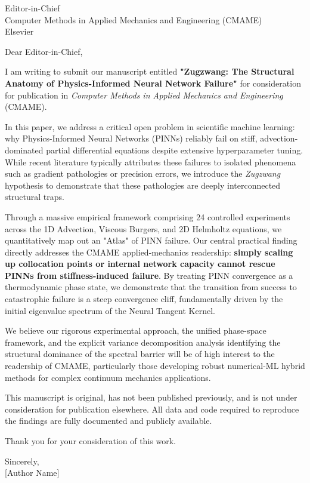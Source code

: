 \documentclass[11pt]{letter}
\begin{document}
\begin{letter}{
Editor-in-Chief\\
Computer Methods in Applied Mechanics and Engineering (CMAME)\\
Elsevier
}

\opening{Dear Editor-in-Chief,}

I am writing to submit our manuscript entitled \textbf{"Zugzwang: The Structural Anatomy of Physics-Informed Neural Network Failure"} for consideration for publication in \textit{Computer Methods in Applied Mechanics and Engineering} (CMAME).

In this paper, we address a critical open problem in scientific machine learning: why Physics-Informed Neural Networks (PINNs) reliably fail on stiff, advection-dominated partial differential equations despite extensive hyperparameter tuning. While recent literature typically attributes these failures to isolated phenomena such as gradient pathologies or precision errors, we introduce the \textit{Zugzwang} hypothesis to demonstrate that these pathologies are deeply interconnected structural traps.

Through a massive empirical framework comprising 24 controlled experiments across the 1D Advection, Viscous Burgers, and 2D Helmholtz equations, we quantitatively map out an "Atlas" of PINN failure. Our central practical finding directly addresses the CMAME applied-mechanics readership: \textbf{simply scaling up collocation points or internal network capacity cannot rescue PINNs from stiffness-induced failure}. By treating PINN convergence as a thermodynamic phase state, we demonstrate that the transition from success to catastrophic failure is a steep convergence cliff, fundamentally driven by the initial eigenvalue spectrum of the Neural Tangent Kernel.

We believe our rigorous experimental approach, the unified phase-space framework, and the explicit variance decomposition analysis identifying the structural dominance of the spectral barrier will be of high interest to the readership of CMAME, particularly those developing robust numerical-ML hybrid methods for complex continuum mechanics applications.

This manuscript is original, has not been published previously, and is not under consideration for publication elsewhere. All data and code required to reproduce the findings are fully documented and publicly available.

Thank you for your consideration of this work.

\closing{Sincerely,\\
\vspace{1cm}
[Author Name]
}

\end{letter}
\end{document}

